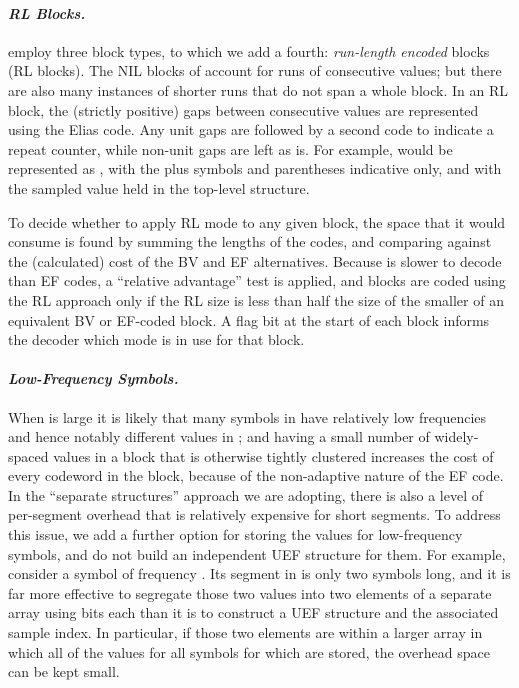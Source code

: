 \documentclass{llncs}
\newcommand{\myparagraph}[1]{\paragraph*{\normalsize\it#1.}}
\begin{document}
\myparagraph{RL Blocks}

{\citet{ov14sigir}} employ three block types, to which we add a
fourth: {\emph{run-length encoded}} blocks (RL blocks).
The NIL blocks of {\citeauthor{ov14sigir}} account for runs of 
consecutive  values; but there are also many instances of
shorter runs that do not span a whole block.
In an RL block, the (strictly positive) gaps between consecutive
 values are represented using the Elias  code.
Any unit gaps are followed by a second  code to indicate a
repeat counter, while non-unit gaps are left as is.
For example,  would be
represented as , with the
plus symbols and parentheses indicative only, and with the sampled
value  held in the top-level structure.

To decide whether to apply RL mode to any given block, the space that
it would consume is found by summing the lengths of the 
codes, and comparing against the (calculated) cost of the BV and EF
alternatives.
Because  is slower to decode than EF codes, a ``relative
advantage'' test is applied, and blocks are coded using the RL
approach only if the RL size is less than half the size of the
smaller of an equivalent BV or EF-coded block.
A flag bit at the start of each block informs the decoder which mode
is in use for that block.


\myparagraph{Low-Frequency Symbols}


When  is large it is likely that many symbols in 
have relatively low frequencies and hence notably different values in
; and having a small number of widely-spaced values in a block
that is otherwise tightly clustered increases the cost of every
codeword in the block, because of the non-adaptive nature of the EF
code.
In the ``separate structures'' approach we are adopting, there is
also a level of per-segment overhead that is relatively expensive for
short segments.
To address this issue, we add a further option for storing the 
values for low-frequency symbols, and do not build an independent UEF
structure for them.
For example, consider a symbol  of frequency .
Its segment in  is only two symbols long, and it is far more
effective to segregate those two values into two elements of a
separate array using  bits each than it is to
construct a UEF structure and the associated sample index.
In particular, if those two elements are within a larger array in
which all of the values for all symbols for which  are stored,
the overhead space can be kept small.
\end{document}
